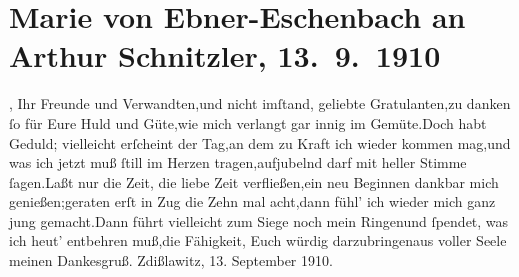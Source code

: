 

               \section[Marie von Ebner-Eschenbach an Arthur Schnitzler, 13. 9. 1910]{ Marie von Ebner-Eschenbach an Arthur Schnitzler,
               13. 9. 1910}\nopagebreak{}\rehead{ }\begin{ledgroupsized}[t]{13cm}\normalsize\beginnumbering{} \toendnotes[C]{\smallbreak\pagebreak[2]} 
\toendnotes[C]{\smallbreak}\stanza{}{\pb}\label{K_L02580-1v}\label{K_L02580-1h}, Ihr Freunde
                  und Verwandten,\newverse{}und nicht imſtand, geliebte Gratulanten,\newverse{}zu danken ſo für Eure Huld und Güte,\newverse{}wie mich verlangt gar innig im Gemüte.\newverse{}Doch habt Geduld; vielleicht erſcheint der Tag,\newverse{}an dem zu Kraft ich wieder kommen mag,\newverse{}und was ich jetzt muß ſtill im Herzen tragen,\newverse{}aufjubelnd darf mit heller Stimme ſagen.\newverse{}Laßt nur die Zeit, die liebe Zeit verfließen,\newverse{}ein neu Beginnen dankbar mich genießen;\newverse{}geraten erſt in Zug die Zehn mal acht,\newverse{}dann fühl’ ich wieder mich ganz jung gemacht.\newverse{}Dann führt vielleicht zum Siege noch mein Ringen\newverse{}und ſpendet, was ich heut’ entbehren muß,\newverse{}die Fähigkeit, Euch würdig darzubringen\newverse{}aus voller Seele meinen Dankesgruß.\stanzaend{}\pstart \spacefill\mbox{}\pend{}\pstart
           Zdißlawitz, 13. September
                     1910.\pend
           \endnumbering{}\end{ledgroupsized}  \newcommand{\dateiname}{L02580}\newcommand{\titel}{Marie von Ebner-Eschenbach an Arthur Schnitzler, 13. 9. 1910}\newcommand{\editorInnen}{Martin Anton Müller und Laura Untner}
            \footnotesize
\begin{ledgroupsized}[t]{11.5cm}
\end{ledgroupsized}
         
      